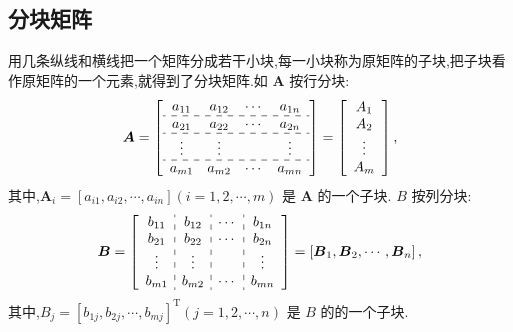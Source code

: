\documentclass[8pt a4paper,oneside,UTF8]{ctexbook}
\begin{document}
\begin{sloppypar}
    \subsection{分块矩阵}
    用几条纵线和横线把一个矩阵分成若干小块,每一小块称为原矩阵的子块,把子块看作原矩阵的一个元素,就得到了分块矩阵.如 $\boldsymbol{A}$ 按行分块:
    $$
        \boldsymbol{A}=\left[\begin{array}{cccc}
                a_{11}             & a_{12}  & \cdots & a_{1 n} \\
                \hdashline a_{21}  & a_{22}  & \cdots & a_{2 n} \\
                \hdashline \vdots  & \vdots  &        & \vdots  \\
                \hdashline a_{m 1} & a_{m 2} & \cdots & a_{m n}
            \end{array}\right]=\left[\begin{array}{c}
                A_1    \\
                A_2    \\
                \vdots \\
                A_m
            \end{array}\right],
    $$
    其中,$\boldsymbol{A}_i=\left[a_{i 1},a_{i 2},\cdots,a_{i n}\right](i=1,2,\cdots,m)$ 是 $\boldsymbol{A}$ 的一个子块.
    $B$ 按列分块:
    $$
        \boldsymbol{B}=\left[\begin{array}{c:c:c:c}
                b_{11}  & b_{12}  & \cdots & b_{1 n} \\
                b_{21}  & b_{22}  & \cdots & b_{2 n} \\
                \vdots  & \vdots  &        & \vdots  \\
                b_{m 1} & b_{m 2} & \cdots & b_{m n}
            \end{array}\right]=\left[\boldsymbol{B}_1,\boldsymbol{B}_2,\cdots,\boldsymbol{B}_n\right],
    $$
    其中,$B_j=\left[b_{1 j},b_{2 j},\cdots,b_{m j}\right]^{\mathrm{T}}(j=1,2,\cdots,n)$ 是 $B$ 的的一个子块.


\end{sloppypar}
\end{document}
